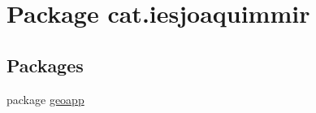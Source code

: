 \hypertarget{namespacecat_1_1iesjoaquimmir}{}\section{Package cat.\+iesjoaquimmir}
\label{namespacecat_1_1iesjoaquimmir}
\subsection*{Packages}
\begin{DoxyCompactItemize}
\item 
package \mbox{\hyperlink{namespacecat_1_1iesjoaquimmir_1_1geoapp}{geoapp}}
\end{DoxyCompactItemize}
